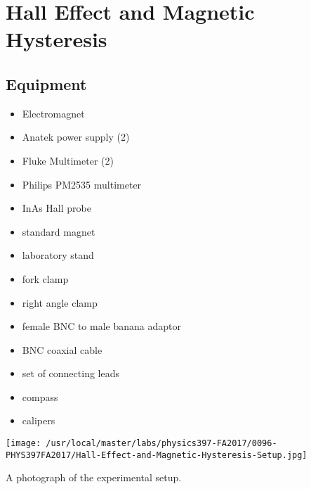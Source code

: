 

%
%


\setcounter{chapter}{5}
\setcounter{equation}{0}
\setcounter{table}{0}
\setcounter{figure}{0}
\chapter{Hall Effect and Magnetic Hysteresis}

\section{Equipment}

\begin{minipage}[t]{0.5\textwidth}
\begin{itemize}[noitemsep]
\item Electromagnet
\item Anatek power supply (2)
\item Fluke Multimeter (2)  %
\item Philips PM2535 multimeter
\item InAs Hall probe
\item standard magnet
\item laboratory stand
\item fork clamp
\end{itemize}
\end{minipage}
\begin{minipage}[t]{0.5\textwidth}
\begin{itemize}[noitemsep]
\item right angle clamp
\item female BNC to male banana adaptor
\item BNC coaxial cable
\item set of connecting leads
\item compass
\item calipers
\end{itemize}
\end{minipage}

\begin{marginfigure}[+2in]
\texttt{[image: /usr/local/master/labs/physics397-FA2017/0096-PHYS397FA2017/Hall-Effect-and-Magnetic-Hysteresis-Setup.jpg]}
\caption{A photograph of the experimental setup.}
\label{fig:HEsetup}
\end{marginfigure}


